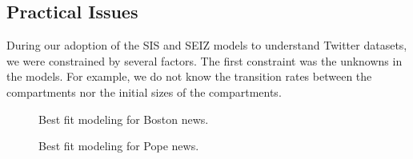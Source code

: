 \subsection{Practical Issues}
During our adoption of the SIS and SEIZ models to understand Twitter datasets, we were constrained by several factors. The first constraint was the unknowns in the models. For example, we do not know the transition rates between the compartments nor the initial sizes of the compartments.


\begin{figure}[h]
\centering
{}
\caption{Best fit modeling for Boston news.}
\label{fig:Boston_bombing}
\end{figure}


\begin{figure}[h]
\centering
{}
\caption{Best fit modeling for Pope news.
\label{fig:Benedict}
}
\end{figure}


